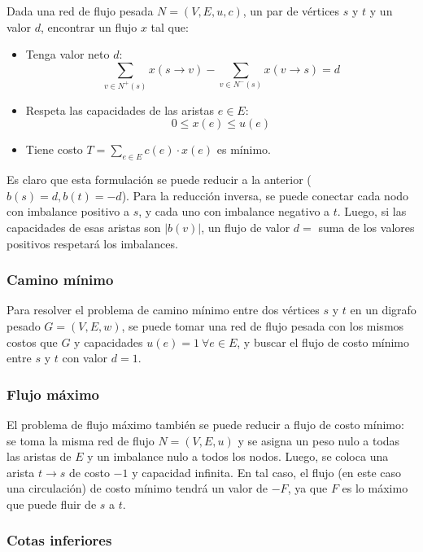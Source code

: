 \documentclass[a4paper]{report}
\begin{document}
\begin{problema}
    Dada una red de flujo pesada $N = (V, E, u, c)$, un par de vértices $s$ y $t$ y un valor $d$, encontrar un flujo $x$ tal que:
    \begin{itemize}
        \item Tenga valor neto $d$:
            $$\sum_{v \in N^+(s)} x(s \rightarrow v) - \sum_{v \in N^-(s)} x(v \rightarrow s) = d$$
        \item Respeta las capacidades de las aristas $e \in E$:
            $$0 \leq x(e) \leq u(e)$$
        \item Tiene costo $T = \sum_{e \in E} c(e) \cdot x(e)$ es mínimo.
    \end{itemize}
\end{problema}

Es claro que esta formulación se puede reducir a la anterior ($b(s) = d, b(t) = -d$). Para la reducción inversa, se puede conectar cada nodo con imbalance positivo a $s$, y cada uno con imbalance negativo a $t$. Luego, si las capacidades de esas aristas son $|b(v)|$, un flujo de valor $d = $ suma de los valores positivos respetará los imbalances.

\subsubsection{Camino mínimo}

Para resolver el problema de camino mínimo entre dos vértices $s$ y $t$ en un digrafo pesado $G = (V, E, w)$, se puede tomar una red de flujo pesada con los mismos costos que $G$ y capacidades $u(e) = 1\ \forall e \in E$, y buscar el flujo de costo mínimo entre $s$ y $t$ con valor $d = 1$.

\subsubsection{Flujo máximo}

El problema de flujo máximo también se puede reducir a flujo de costo mínimo: se toma la misma red de flujo $N = (V, E, u)$ y se asigna un peso nulo a todas las aristas de $E$ y un imbalance nulo a todos los nodos. Luego, se coloca una arista $t \rightarrow s$ de costo $-1$ y capacidad infinita. En tal caso, el flujo (en este caso una circulación) de costo mínimo tendrá un valor de $-F$, ya que $F$ es lo máximo que puede fluir de $s$ a $t$.

\subsubsection{Cotas inferiores}
\end{document}
